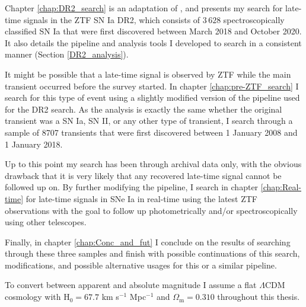 \documentclass[a4paper,oneside,12pt, class=Latex/Classes/PhDthesisPSnPDF, crop=false]{standalone}
\begin{document}
Chapter \ref{chap:DR2_search} is an adaptation of \cite{Terwel_2024_paper1}, and presents my search for late-time signals in the ZTF SN Ia DR2, which consists of $3\,628$ spectroscopically classified SN Ia that were first discovered between March 2018 and October 2020. It also details the pipeline and analysis tools I developed to search in a consistent manner (Section \ref{DR2_analysis}).

It might be possible that a late-time signal is observed by ZTF while the main transient occurred before the survey started. In chapter \ref{chap:pre-ZTF_search} I search for this type of event using a slightly modified version of the pipeline used for the DR2 search. As the analysis is exactly the same whether the original transient was a SN Ia, SN II, or any other type of transient, I search through a sample of 8707 transients that were first discovered between 1 January 2008 and 1 January 2018.

Up to this point my search has been through archival data only, with the obvious drawback that it is very likely that any recovered late-time signal cannot be followed up on. By further modifying the pipeline, I search in chapter \ref{chap:Real-time} for late-time signals in SNe Ia in real-time using the latest ZTF observations with the goal to follow up photometrically and/or spectroscopically using other telescopes.

Finally, in chapter \ref{chap:Conc_and_fut} I conclude on the results of searching through these three samples and finish with possible continuations of this search, modifications, and possible alternative usages for this or a similar pipeline.

To convert between apparent and absolute magnitude I assume a flat $\Lambda$CDM cosmology with H$_0 = 67.7$ km s$^{-1}$ Mpc$^{-1}$ and $\Omega_\text{m} = 0.310$ \citep{Planck18VI} throughout this thesis.
\end{document}
